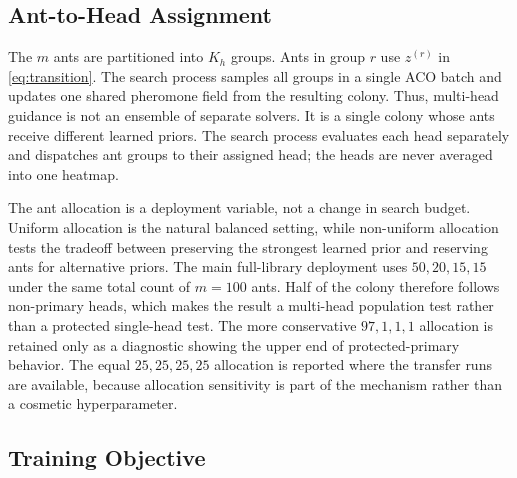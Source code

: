 \documentclass[11pt]{article}
\newcommand{\cref}[1]{\ref{#1}}
\begin{document}
\subsection{Ant-to-Head Assignment}
\label{sec:mh-assignment}

The $m$ ants are partitioned into $K_h$ groups.
Ants in group $r$ use $z^{(r)}$ in \cref{eq:transition}.
The search process samples all groups in a single ACO batch and updates one shared pheromone field from the resulting colony.
Thus, multi-head guidance is not an ensemble of separate solvers.
It is a single colony whose ants receive different learned priors.
The search process evaluates each head separately and dispatches ant groups to their assigned head; the heads are never averaged into one heatmap.

The ant allocation is a deployment variable, not a change in search budget.
Uniform allocation is the natural balanced setting, while non-uniform allocation tests the tradeoff between preserving the strongest learned prior and reserving ants for alternative priors.
The main full-library deployment uses $50,20,15,15$ under the same total count of $m=100$ ants.
Half of the colony therefore follows non-primary heads, which makes the result a multi-head population test rather than a protected single-head test.
The more conservative $97,1,1,1$ allocation is retained only as a diagnostic showing the upper end of protected-primary behavior.
The equal $25,25,25,25$ allocation is reported where the transfer runs are available, because allocation sensitivity is part of the mechanism rather than a cosmetic hyperparameter.

\subsection{Training Objective}
\label{sec:mh-training}
\end{document}
